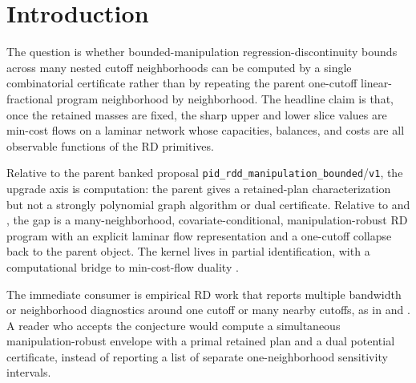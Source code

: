 \documentclass[11pt]{article}
\theoremstyle{definition}
\theoremstyle{plain}
\theoremstyle{remark}
\begin{document}
\begin{abstract}
The banked parent result \texttt{pid\_rdd\_manipulation\_bounded}/\texttt{v1} gives a
sharp one-cutoff partial-identification interval through a retained-mass linear-fractional
program. This proposal asks whether the same bounded-manipulation logic across many nested
cutoff neighborhoods admits a computable network certificate rather than a separate ratio
search at each neighborhood. The main claim is that every fixed retained-mass slice of the
many-neighborhood problem is a laminar transportation program with a totally unimodular
constraint matrix and an explicit node-potential dual. The flagship conjecture is that the
global sharp bound is obtained by optimizing over the extendable slice set and that the
one-neighborhood dual collapses exactly to the parent interval program. If true, the result
would turn many-neighborhood manipulation bounds into an auditable combinatorial object
rather than a collection of uncoupled linear-fractional searches.
\end{abstract}

\section{Introduction}
The question is whether bounded-manipulation regression-discontinuity bounds across many
nested cutoff neighborhoods can be computed by a single combinatorial certificate rather
than by repeating the parent one-cutoff linear-fractional program neighborhood by
neighborhood. The headline claim is that, once the retained masses are fixed, the sharp
upper and lower slice values are min-cost flows on a laminar network whose capacities,
balances, and costs are all observable functions of the RD primitives.

Relative to the parent banked proposal \texttt{pid\_rdd\_manipulation\_bounded}/\texttt{v1},
the upgrade axis is computation: the parent gives a retained-plan characterization but not a
strongly polynomial graph algorithm or dual certificate. Relative to
\citet{gerard_rokkanen_rothe_2020_rdbounds} and
\citet{rosenman_rajkumar_gauriot_slonim_2019_discrete_manipulation}, the gap is a
many-neighborhood, covariate-conditional, manipulation-robust RD program with an explicit
laminar flow representation and a one-cutoff collapse back to the parent object. The kernel
lives in partial identification, with a computational bridge to min-cost-flow duality
\citep{orlin_1993_mincostflow}.

The immediate consumer is empirical RD work that reports multiple bandwidth or neighborhood
diagnostics around one cutoff or many nearby cutoffs, as in
\citet{cattaneo_keele_titiunik_vazquezbare_2021_multicutoff} and
\citet{bertanha_2020_many_thresholds}. A reader who accepts the conjecture would compute a
simultaneous manipulation-robust envelope with a primal retained plan and a dual potential
certificate, instead of reporting a list of separate one-neighborhood sensitivity intervals.
\end{document}
